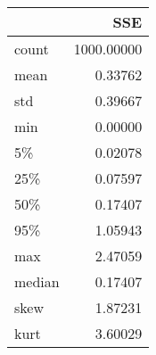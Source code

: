 \begin{tabular}{lr}
\toprule
{} &     SSE \\
\midrule
count   &  1000.00000 \\
mean    &     0.33762 \\
std     &     0.39667 \\
min     &     0.00000 \\
5\%     &     0.02078 \\
25\%    &     0.07597 \\
50\%    &     0.17407 \\
95\%    &     1.05943 \\
max     &     2.47059 \\
median  &     0.17407 \\
skew    &     1.87231 \\
kurt    &     3.60029 \\
\bottomrule
\end{tabular}
